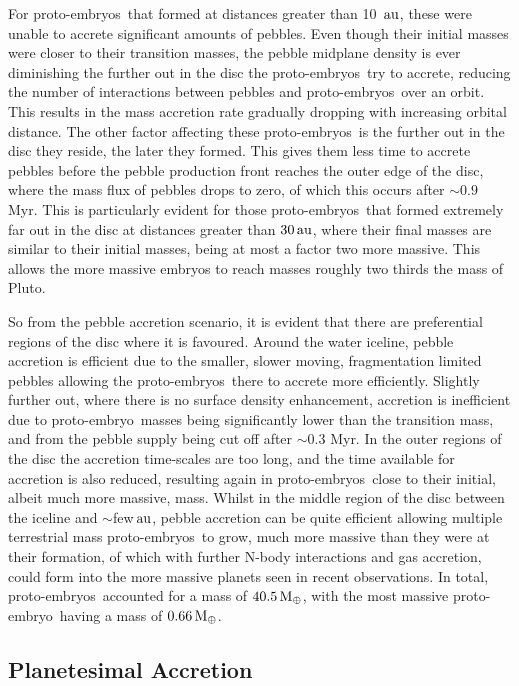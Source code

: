 \documentclass[a4paper,fleqn,usenatbib]{mnras}
\newcommand{\me}{{\, {\rm M}_{\oplus}}}
\newcommand{\au}{{\, {\rm au}}}
\newcommand{\emb}{{{proto-embryo~}}}
\newcommand{\embs}{{{proto-embryos~}}}
\begin{document}
For \embs that formed at distances greater than 10 $\au$, these were unable to accrete significant amounts of pebbles.
Even though their initial masses were closer to their transition masses, the pebble midplane density is ever diminishing the further out in the disc the \embs try to accrete, reducing the number of interactions between pebbles and \embs over an orbit.
This results in the mass accretion rate gradually dropping with increasing orbital distance.
The other factor affecting these \embs is the further out in the disc they reside, the later they formed.
This gives them less time to accrete pebbles before the pebble production front reaches the outer edge of the disc, where the mass flux of pebbles drops to zero, of which this occurs after $\sim 0.9$ Myr.
This is particularly evident for those \embs that formed extremely far out in the disc at distances greater than $30 \au$, where their final masses are similar to their initial masses, being at most a factor two more massive.
This allows the more massive embryos to reach masses roughly two thirds the mass of Pluto.

So from the pebble accretion scenario, it is evident that there are preferential regions of the disc where it is favoured.
Around the water iceline, pebble accretion is efficient due to the smaller, slower moving, fragmentation limited pebbles allowing the \embs there to accrete more efficiently.
Slightly further out, where there is no surface density enhancement, accretion is inefficient due to \emb masses being significantly lower than the transition mass, and from the pebble supply being cut off after $\sim 0.3$ Myr.
In the outer regions of the disc the accretion time-scales are too long, and the time available for accretion is also reduced, resulting again in \embs close to their initial, albeit much more massive, mass.
Whilst in the middle region of the disc between the iceline and $\sim$few$\au$, pebble accretion can be quite efficient allowing multiple terrestrial mass \embs to grow, much more massive than they were at their formation, of which with further N-body interactions and gas accretion, could form into the more massive planets seen in recent observations.
In total, \embs accounted for a mass of $40.5 \me$, with the most massive \emb having a mass of $0.66 \me$.

\subsection{Planetesimal Accretion}
\label{sec:acc_pltml}
\end{document}

